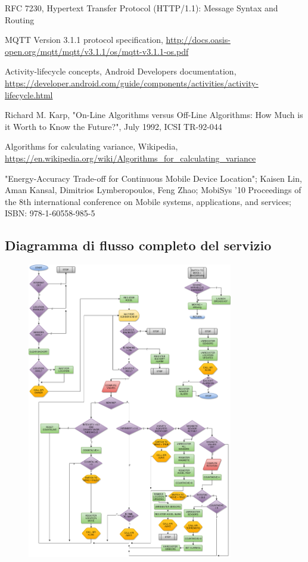 \documentclass[a4paper,10pt]{memoir}
\begin{document}
\begin{thebibliography}{9}
	RFC 7230, Hypertext Transfer Protocol (HTTP/1.1): Message Syntax and Routing

	MQTT Version 3.1.1 protocol specification, \url{http://docs.oasis-open.org/mqtt/mqtt/v3.1.1/os/mqtt-v3.1.1-os.pdf}

	Activity-lifecycle concepts, Android Developers documentation, \url{https://developer.android.com/guide/components/activities/activity-lifecycle.html}

	Richard M. Karp, "On-Line Algorithms versus Off-Line Algorithms: How Much is it Worth to Know the Future?", July 1992, ICSI TR-92-044

	Algorithms for calculating variance, Wikipedia, \url{https://en.wikipedia.org/wiki/Algorithms_for_calculating_variance}

	"Energy-Accuracy Trade-off for Continuous Mobile Device Location"; Kaisen Lin, Aman Kansal, Dimitrios Lymberopoulos, Feng Zhao; MobiSys '10 Proceedings of the 8th international conference on Mobile systems, applications, and services; ISBN: 978-1-60558-985-5

\end{thebibliography}

\begin{appendices}
\chapter{Diagramma di flusso completo del servizio}
\begin{figure}[ht]
\centering
\label{fig:serviceflowdiagram}
\includegraphics[width=0.8\textwidth]{SeismoCloud_flowdiag}
\end{figure}
\end{appendices}
\end{document}
